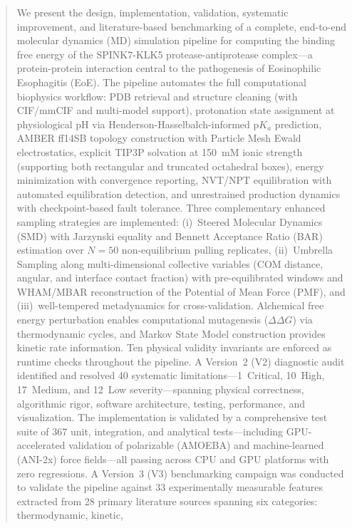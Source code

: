 \documentclass[conference]{IEEEtran}
\begin{document}
\begin{abstract}
We present the design, implementation, validation, systematic
improvement, and literature-based benchmarking of a complete, end-to-end
molecular dynamics (MD) simulation pipeline for computing the binding free
energy of the SPINK7-KLK5 protease-antiprotease complex---a
protein-protein interaction central to the pathogenesis of Eosinophilic
Esophagitis (EoE).  The pipeline automates the full computational
biophysics workflow: PDB retrieval and structure cleaning (with CIF/mmCIF
and multi-model support), protonation state assignment at physiological pH
via Henderson-Hasselbalch-informed $\mathrm{p}K_a$ prediction, AMBER
ff14SB topology construction with Particle Mesh Ewald electrostatics,
explicit TIP3P solvation at 150~mM ionic strength (supporting both
rectangular and truncated octahedral boxes), energy minimization with
convergence reporting, NVT/NPT equilibration with automated equilibration
detection, and unrestrained production dynamics with checkpoint-based fault
tolerance.  Three complementary enhanced sampling strategies are
implemented: (i)~Steered Molecular Dynamics (SMD) with Jarzynski equality
and Bennett Acceptance Ratio (BAR) estimation over $N=50$ non-equilibrium
pulling replicates, (ii)~Umbrella Sampling along multi-dimensional
collective variables (COM distance, angular, and interface contact
fraction) with pre-equilibrated windows and WHAM/MBAR reconstruction of
the Potential of Mean Force (PMF), and (iii)~well-tempered metadynamics
for cross-validation.  Alchemical free energy perturbation enables
computational mutagenesis ($\Delta\Delta G$) via thermodynamic cycles,
and Markov State Model construction provides kinetic rate information.
Ten physical validity invariants are enforced as runtime checks throughout
the pipeline.  A Version~2 (V2) diagnostic audit identified and resolved
40 systematic limitations---1~Critical, 10~High, 17~Medium, and
12~Low severity---spanning physical correctness, algorithmic rigor,
software architecture, testing, performance, and visualization.  The
implementation is validated by a comprehensive test suite of 367 unit,
integration, and analytical tests---including GPU-accelerated validation
of polarizable (AMOEBA) and machine-learned (ANI-2x) force
fields---all passing across CPU and GPU platforms with zero regressions.
A Version~3 (V3) benchmarking campaign was conducted to validate the
pipeline against 33 experimentally measurable features extracted from 28
primary literature sources spanning six categories: thermodynamic, kinetic,

\end{abstract}
\end{document}
